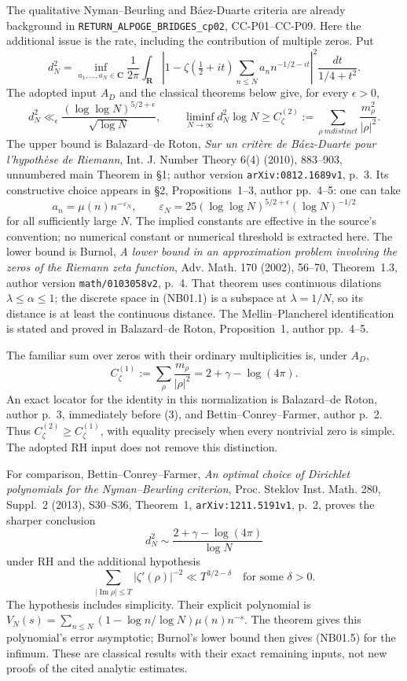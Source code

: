 The qualitative Nyman--Beurling and B\'aez-Duarte criteria are
already background in \texttt{RETURN\_ALPOGE\_BRIDGES\_cp02},
CC-P01--CC-P09. Here the additional issue is the rate, including
the contribution of multiple zeros. Put
\[
 d_N^2=\inf_{a_1,\ldots,a_N\in\mathbf C}
 \frac1{2\pi}\int_{\mathbf R}
 \left|1-\zeta(\tfrac12+it)
       \sum_{n\le N}a_n n^{-1/2-it}\right|^2
                 \frac{dt}{1/4+t^2}.
 \tag{NB01.1}
\]
The adopted input $A_D$ and the classical theorems below give,
for every $\epsilon>0$,
\[
 d_N^2\ll_\epsilon
 \frac{(\log\log N)^{5/2+\epsilon}}{\sqrt{\log N}},
 \qquad
 \liminf_{N\to\infty}d_N^2\log N
       \ge C_\zeta^{(2)}
       :=\sum_{\rho\ {
m distinct}}
                    \frac{m_\rho^2}{|\rho|^2}.
 \tag{NB01.2}
\]
The upper bound is Balazard--de Roton,
\emph{Sur un crit\`ere de B\'aez-Duarte pour l'hypoth\`ese
de Riemann}, Int. J. Number Theory 6(4) (2010), 883--903,
unnumbered main Theorem in \S1; author version
\texttt{arXiv:0812.1689v1}, p.~3. Its constructive choice
appears in \S2, Propositions~1--3, author pp.~4--5:
one can take
\[
 a_n=\mu(n)n^{-\varepsilon_N},\qquad
 \varepsilon_N=25(\log\log N)^{5/2+\epsilon}
                         (\log N)^{-1/2}
 \tag{NB01.3}
\]
for all sufficiently large $N$. The implied constants are
effective in the source's convention; no numerical constant
or numerical threshold is extracted here.
The lower bound is Burnol, \emph{A lower bound in an
approximation problem involving the zeros of the Riemann
zeta function}, Adv. Math. 170 (2002), 56--70,
Theorem~1.3, author version \texttt{math/0103058v2}, p.~4.
That theorem uses continuous dilations $\lambda\le\alpha\le1$;
the discrete space in (NB01.1) is a subspace at $\lambda=1/N$,
so its distance is at least the continuous distance.
The Mellin--Plancherel identification is stated and proved in
Balazard--de Roton, Proposition~1, author pp.~4--5.

The familiar sum over zeros with their ordinary multiplicities
is, under $A_D$,
\[
 C_\zeta^{(1)}:=\sum_\rho\frac{m_\rho}{|\rho|^2}
                    =2+\gamma-\log(4\pi).
 \tag{NB01.4}
\]
An exact locator for the identity in this normalization is
Balazard--de Roton, author p.~3, immediately before (3),
and Bettin--Conrey--Farmer, author p.~2.
Thus $C_\zeta^{(2)}\ge C_\zeta^{(1)}$, with equality precisely
when every nontrivial zero is simple. The adopted RH input
does not remove this distinction.

For comparison, Bettin--Conrey--Farmer,
\emph{An optimal choice of Dirichlet polynomials for the
Nyman--Beurling criterion}, Proc. Steklov Inst. Math.
280, Suppl.~2 (2013), S30--S36, Theorem~1,
\texttt{arXiv:1211.5191v1}, p.~2, proves the sharper conclusion
\[
 d_N^2\sim\frac{2+\gamma-\log(4\pi)}{\log N}
 \tag{NB01.5}
\]
under RH and the additional hypothesis
\[
 \sum_{|\operatorname{Im}\rho|\le T}
                    |\zeta'(\rho)|^{-2}
                  \ll T^{3/2-\delta}\quad\text{for some }\delta>0.
 \tag{NB01.6}
\]
The hypothesis includes simplicity. Their explicit polynomial is
$V_N(s)=\sum_{n\le N}(1-\log n/\log N)\mu(n)n^{-s}$.
The theorem gives this polynomial's error asymptotic; Burnol's
lower bound then gives (NB01.5) for the infimum. These are
classical results with their exact remaining inputs, not new
proofs of the cited analytic estimates.

